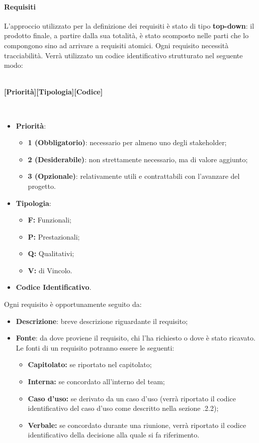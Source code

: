 \paragraph{Requisiti}
L'approccio utilizzato per la definizione dei requisiti è stato di tipo \textbf{top-down}: il prodotto finale, a partire dalla sua totalità, è stato scomposto nelle parti che lo compongono sino ad arrivare a requisiti atomici. Ogni requisito necessità tracciabilità. Verrà utilizzato un codice identificativo strutturato nel seguente modo:
\\\\
\centerline{\textbf{[Priorità][Tipologia][Codice]}}\\
\begin{itemize}
  \item \textbf{Priorità}:
  \begin{itemize}
    \item \textbf{1 (Obbligatorio)}: necessario per almeno uno degli stakeholder;
    \item \textbf{2 (Desiderabile)}: non strettamente necessario, ma di valore aggiunto;
    \item \textbf{3 (Opzionale)}: relativamente utili e contrattabili con l'avanzare del progetto.
  \end{itemize}
  \item \textbf{Tipologia}:
  \begin{itemize}
    \item \textbf{F:} Funzionali;
    \item \textbf{P:} Prestazionali;
    \item \textbf{Q:} Qualitativi;
    \item \textbf{V:} di Vincolo.
  \end{itemize}
  \item \textbf{Codice Identificativo}.
\end{itemize}
Ogni requisito è opportunamente seguito da:
\begin{itemize}
  \item \textbf{Descrizione}: breve descrizione riguardante il requisito;
  \item \textbf{Fonte}: da dove proviene il requisito, chi l'ha richiesto o dove è stato ricavato. Le fonti di un requisito potranno essere le seguenti:
  \begin{itemize}
  	\item \textbf{Capitolato:} se riportato nel capitolato\glos;
  	\item \textbf{Interna:} se concordato all'interno del team;
  	\item \textbf{Caso d'uso:} se derivato da un caso d'uso (verrà riportato il codice identificativo del caso d'uso come descritto nella sezione .2.2);
  	\item \textbf{Verbale:} se concordato durante una riunione, verrà riportato il codice identificativo della decisione alla quale si fa riferimento.
  \end{itemize}
\end{itemize}

